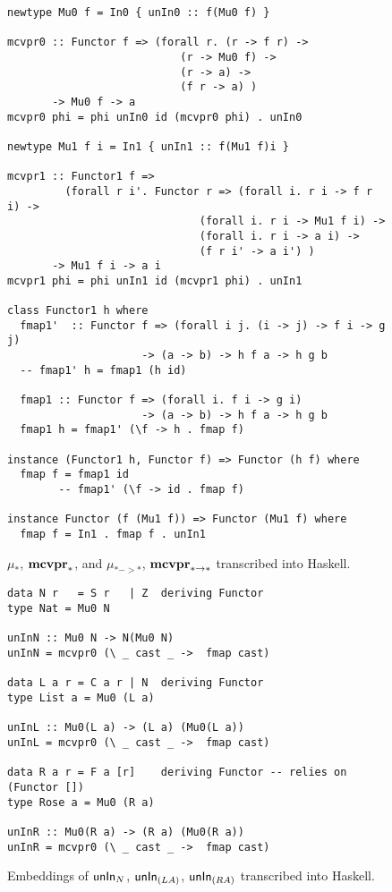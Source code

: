 \begin{figure}
\begin{singlespace}
\begin{lstlisting}
newtype Mu0 f = In0 { unIn0 :: f(Mu0 f) }

mcvpr0 :: Functor f => (forall r. (r -> f r) ->
                           (r -> Mu0 f) ->
                           (r -> a) ->
                           (f r -> a) )
       -> Mu0 f -> a
mcvpr0 phi = phi unIn0 id (mcvpr0 phi) . unIn0

newtype Mu1 f i = In1 { unIn1 :: f(Mu1 f)i }

mcvpr1 :: Functor1 f =>
         (forall r i'. Functor r => (forall i. r i -> f r i) ->
                              (forall i. r i -> Mu1 f i) ->
                              (forall i. r i -> a i) ->
                              (f r i' -> a i') )
       -> Mu1 f i -> a i
mcvpr1 phi = phi unIn1 id (mcvpr1 phi) . unIn1

class Functor1 h where
  fmap1'  :: Functor f => (forall i j. (i -> j) -> f i -> g j)
                     -> (a -> b) -> h f a -> h g b
  -- fmap1' h = fmap1 (h id)

  fmap1 :: Functor f => (forall i. f i -> g i)
                     -> (a -> b) -> h f a -> h g b
  fmap1 h = fmap1' (\f -> h . fmap f)

instance (Functor1 h, Functor f) => Functor (h f) where
  fmap f = fmap1 id
        -- fmap1' (\f -> id . fmap f)

instance Functor (f (Mu1 f)) => Functor (Mu1 f) where
  fmap f = In1 . fmap f . unIn1
\end{lstlisting}
\end{singlespace}
\caption{$\mu_{*}$, $\mathbf{mcvpr}_{*}$, and $\mu_{* -> *}$, $\mathbf{mcvpr}_{* -> *}$
	transcribed into Haskell.}
\label{fig:HaskellFunctor1}
\end{figure}

\begin{figure}
\begin{lstlisting}
data N r   = S r   | Z  deriving Functor
type Nat = Mu0 N

unInN :: Mu0 N -> N(Mu0 N)
unInN = mcvpr0 (\ _ cast _ ->  fmap cast)

data L a r = C a r | N  deriving Functor
type List a = Mu0 (L a)

unInL :: Mu0(L a) -> (L a) (Mu0(L a))
unInL = mcvpr0 (\ _ cast _ ->  fmap cast)

data R a r = F a [r]    deriving Functor -- relies on (Functor [])
type Rose a = Mu0 (R a)

unInR :: Mu0(R a) -> (R a) (Mu0(R a))
unInR = mcvpr0 (\ _ cast _ ->  fmap cast)
\end{lstlisting}
\caption{Embeddings of $\mathsf{unIn}_N$, $\mathsf{unIn}_{(L A)}$, $\mathsf{unIn}_{(R A)}$
	transcribed into Haskell.}
\label{fig:HaskellunInRegular}
\end{figure}

